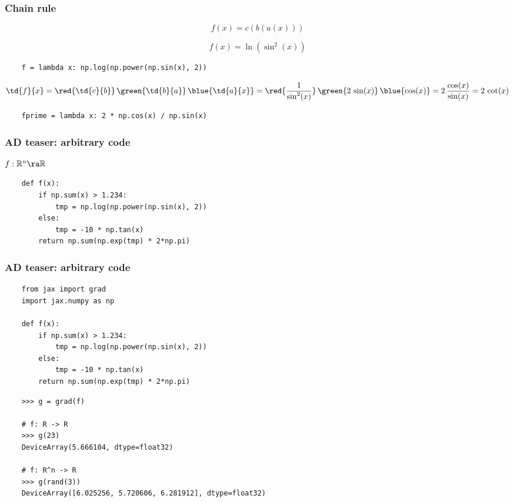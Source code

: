 \documentclass[fleqn,10pt]{beamer}
\begin{document}
\begin{frame}[fragile]
    \frametitle{Chain rule}
    \begin{equation*}
        f(x) = c(b(a(x)))
    \end{equation*}

    \begin{equation*}
        f(x) = \ln(\sin^2(x))
    \end{equation*}

    \begin{verbatim}
    f = lambda x: np.log(np.power(np.sin(x), 2))
    \end{verbatim}

    \begin{equation*}
        \td{f}{x} = \red{\td{c}{b}}\,\green{\td{b}{a}}\,\blue{\td{a}{x}}
            = \red{\frac{1}{\sin^2(x)}}\,\green{2\,\sin(x)}\,\blue{\cos(x)}
            = 2\,\frac{\cos(x)}{\sin(x)} = 2\,\cot(x)
    \end{equation*}

    \begin{verbatim}
    fprime = lambda x: 2 * np.cos(x) / np.sin(x)
    \end{verbatim}
\end{frame}


\begin{frame}[fragile]
    \frametitle{AD teaser: arbitrary code}
    $f:\mathbb R^n\ra\mathbb R$
    \begin{verbatim}
    def f(x):
        if np.sum(x) > 1.234:
            tmp = np.log(np.power(np.sin(x), 2))
        else:
            tmp = -10 * np.tan(x)
        return np.sum(np.exp(tmp) * 2*np.pi)
    \end{verbatim}
    \vfill
\end{frame}


\begin{frame}[fragile]
    \frametitle{AD teaser: arbitrary code}
    \begin{verbatim}
    from jax import grad
    import jax.numpy as np

    def f(x):
        if np.sum(x) > 1.234:
            tmp = np.log(np.power(np.sin(x), 2))
        else:
            tmp = -10 * np.tan(x)
        return np.sum(np.exp(tmp) * 2*np.pi)
    \end{verbatim}
    \vfill
    \begin{verbatim}
    >>> g = grad(f)

    # f: R -> R
    >>> g(23)
    DeviceArray(5.666104, dtype=float32)

    # f: R^n -> R
    >>> g(rand(3))
    DeviceArray([6.025256, 5.720606, 6.281912], dtype=float32)
    \end{verbatim}
\end{frame}
\end{document}
